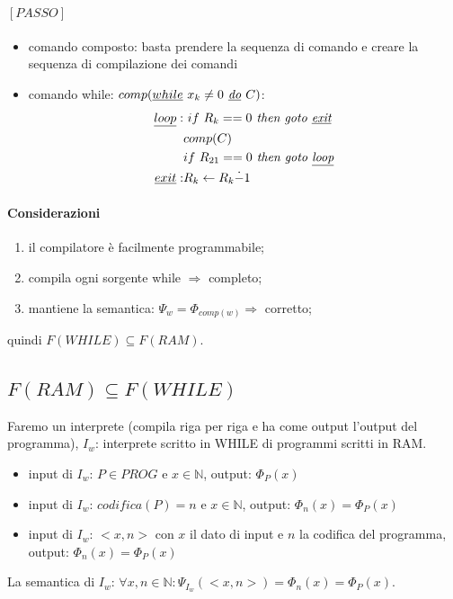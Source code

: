 \documentclass{article}
\begin{document}
\paragraph{$[PASSO]$}
\begin{itemize}
	\item comando composto: basta prendere la sequenza di comando e creare la sequenza di compilazione dei comandi
	\item comando while: $comp(\underline{while}\text{ } x_k \neq 0 \textit{ \underline{do} } C)$:
	\begin{displaymath}
		\begin{split}
			\underline{loop}: &\text{ } if \text{ } R_k == 0 \textit{ then goto \underline{exit}} \\
			 & comp(C) \\
			 & if \text{ } R_{21} == 0 \textit{ then goto \underline{loop}} \\
			 \underline{exit}: & R_k \leftarrow R_k \dot{-} 1
		\end{split}
	\end{displaymath}
\end{itemize}

\paragraph{Considerazioni}
\begin{enumerate}
	\item il compilatore è facilmente programmabile;
	\item compila ogni sorgente while $\Rightarrow$ completo;
	\item mantiene la semantica: $\Psi_w = \Phi_{comp(w)}  \Rightarrow$ corretto;
\end{enumerate}
quindi $F(WHILE) \subseteq F(RAM)$.

\subsection{$F(RAM) \subseteq F(WHILE)$}
Faremo un interprete (compila riga per riga e ha come output l'output del programma), $I_w$: interprete scritto in WHILE di programmi scritti in RAM.
\begin{itemize}
	\item input di $I_w$: $P \in PROG$ e $x \in \mathbb{N}$, output: $\Phi_P(x)$
	\item input di $I_w$: $codifica(P) = n$ e $x \in \mathbb{N}$, output: $\Phi_n(x) = \Phi_P(x)$
	\item input di $I_w$: $ <x,n>$ con $x$ il dato di input e $n$ la codifica del programma, output: $\Phi_n(x) =\Phi_P(x)$
\end{itemize}
La semantica di $I_w$: $\forall x,n \in \mathbb{N}: \Psi_{I_w}(<x,n>)=\Phi_n(x)=\Phi_P(x)$.
\end{document}
